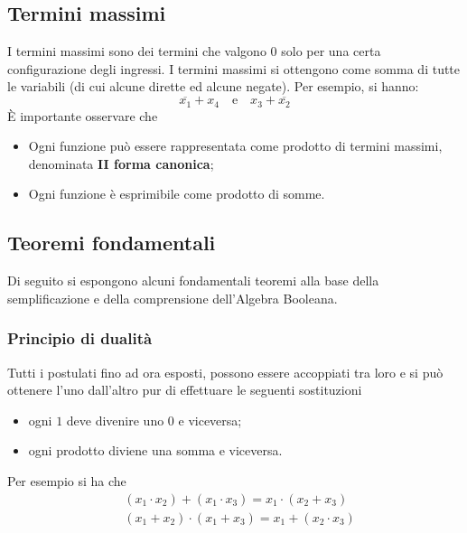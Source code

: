 \documentclass[a4paper]{extarticle}
\begin{document}
\vspace{1em}
\noindent
\subsection{Termini massimi}
I termini massimi sono dei termini che valgono $0$ solo per una certa configurazione degli ingressi. I termini massimi si ottengono come somma di tutte le variabili (di cui alcune dirette ed alcune negate). Per esempio, si hanno:
\[\overline{x_1} + x_4 \hspace{1em} \text{e} \hspace{1em} x_3 + \overline{x_2}\]
È importante osservare che
\begin{itemize}
    \item Ogni funzione può essere rappresentata come prodotto di termini massimi, denominata \textbf{II forma canonica};
    \item Ogni funzione è esprimibile come prodotto di somme.
\end{itemize}

\vspace{1em}
\noindent
\subsection{Teoremi fondamentali}
Di seguito si espongono alcuni fondamentali teoremi alla base della semplificazione e della comprensione dell'Algebra Booleana.

\vspace{1em}
\noindent
\subsubsection{Principio di dualità}
Tutti i postulati fino ad ora esposti, possono essere accoppiati tra loro e si può ottenere l'uno dall'altro pur di effettuare le seguenti sostituzioni
\begin{itemize}
    \item ogni $1$ deve divenire uno $0$ e viceversa;
    \item ogni prodotto diviene una somma e viceversa.
\end{itemize}
Per esempio si ha che
\begin{align*}
    &(x_1 \cdot x_2) + (x_1 \cdot x_3) = x_1 \cdot (x_2 + x_3)\\
    &(x_1 + x_2) \cdot (x_1 + x_3) = x_1 + (x_2 \cdot x_3)
\end{align*}

\vspace{1em}
\noindent
\end{document}
